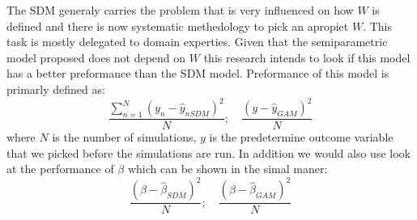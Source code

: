 \documentclass{article}
\begin{document}
The SDM generaly carries the problem that is very influenced on how $W$ is defined and there is now systematic
methedology to pick an apropiet $W$. This task is mostly delegated to domain experties. Given that the semiparametric
model proposed does not depend on $W$ this research intends to look if this model has a better preformance than the SDM model.
Preformance of this model is primarly defined as:
\begin{equation}
	\frac{\sum_{n=1}^N(y_n-\hat{y}_{nSDM})^2}{N}; \quad \frac{(y-\hat{y}_{GAM})^2}{N}
	\label{eq:pref}
\end{equation}
where $N$ is the number of simulations, $y$ is the predetermine outcome variable that we picked before the simulations are run.
In addition we would also use look at the performance of $\beta$ which can be shown in the simal maner:
\begin{equation}
	\frac{(\beta-\hat{\beta}_{SDM})^2}{N}; \quad \frac{(\beta-\hat{\beta}_{GAM})^2}{N}
	\label{eq:pref2}
\end{equation}





\end{document}
